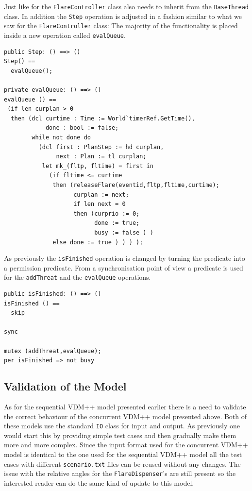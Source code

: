 \documentclass{overturerepchap}
\begin{document}
Just like for the \texttt{FlareController} class also needs to inherit
from the \texttt{BaseThread} class. In addition the \texttt{Step}
operation is adjusted in a fashion similar to what we saw for the
\texttt{Flare\-Controller} class: The majority of the functionality
is placed inside a new operation called \texttt{evalQueue}.

\begin{lstlisting}
public Step: () ==> ()
Step() ==
  evalQueue();

private evalQueue: () ==> ()
evalQueue () ==
 (if len curplan > 0
  then (dcl curtime : Time := World`timerRef.GetTime(),
            done : bool := false;
        while not done do
          (dcl first : PlanStep := hd curplan,
               next : Plan := tl curplan;
           let mk_(fltp, fltime) = first in
             (if fltime <= curtime
              then (releaseFlare(eventid,fltp,fltime,curtime);
                    curplan := next;
                    if len next = 0
                    then (curprio := 0; 
                          done := true; 
                          busy := false ) )
              else done := true ) ) ) );
\end{lstlisting}

As previously the \texttt{isFinished} operation is changed by turning
the predicate into a permission predicate. From a synchronisation point of
view a {\bf{}} predicate is used for the \texttt{addThreat} and the 
\texttt{evalQueue} operations.

\begin{lstlisting}
public isFinished: () ==> ()
isFinished () == 
  skip

sync

mutex (addThreat,evalQueue);
per isFinished => not busy
\end{lstlisting}


\subsection{Validation of the Model}

As for the sequential VDM++ model presented earlier there is a need to
validate the correct behaviour of the concurrent VDM++ model presented
above. Both of these models use the standard
\texttt{IO} class for input and output. As previously one would start 
this by providing simple test cases and
then gradually make them more and more complex. Since the input format
used for the concurrent VDM++ model is identical to the one used for the
sequential VDM++ model all the test cases with different 
\texttt{scenario.txt} files can be reused without any changes. 
The issue with the 
relative angles for the \texttt{FlareDispenser}'s are still present
so the interested reader can do the same kind of update to this model.
\end{document}
